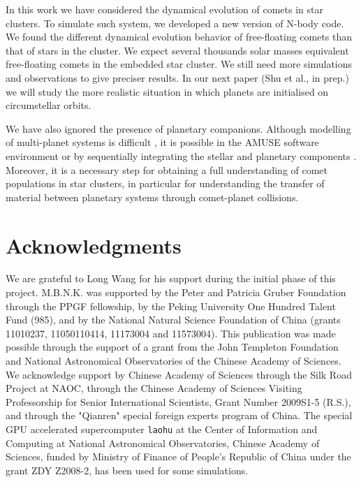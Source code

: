 \documentclass[usenatbib]{mn2e}
\begin{document}


In this work we have considered the dynamical evolution of comets in star clusters. To simulate such system, we developed a new version of N-body code. We found the different dynamical evolution behavior of free-floating comets than that of stars in the cluster. We expect several thousands solar masses equivalent free-floating comets in the embedded star cluster. We still need more simulations and observations to give preciser results.
In our next paper (Shu et al., in prep.) we will study the more realistic situation in which planets are initialised on circumstellar orbits. 

We have also ignored the presence of planetary companions. Although modelling of multi-planet systems is difficult \citep[][]{Hao:2013aa, Shara:2016aa}, it is possible in the AMUSE software environment \citep[see][]{Portegies-Zwart:2013aa, Pelupessy:2013aa, Cai:2016aa} or by sequentially integrating the stellar and planetary components \citep[][]{Cai:2015aa}. Moreover, it is a necessary step for obtaining a full understanding of comet populations in star clusters, in particular for understanding the transfer of material between planetary systems through comet-planet collisions. 


\section*{Acknowledgments}
We are grateful to Long Wang for his support during the initial phase of this project.
M.B.N.K. was supported by the Peter and Patricia Gruber Foundation through the PPGF fellowship, by the Peking University One Hundred Talent Fund (985), and by the National Natural Science Foundation of China (grants 11010237, 11050110414, 11173004 and 11573004). 
This publication was made possible through the support of a grant from 
the John Templeton Foundation and National Astronomical Observatories of the
Chinese Academy of Sciences. 
We acknowledge support by Chinese Academy of Sciences through the Silk Road
Project at NAOC, through the Chinese Academy of Sciences Visiting Professorship for Senior International Scientists, Grant Number 2009S1-5 (R.S.), and through the "Qianren" special foreign experts program of China.
The special GPU accelerated supercomputer {\tt laohu} at the Center of Information and
Computing at National Astronomical Observatories, Chinese Academy of Sciences, funded by Ministry of Finance of People's Republic of China under the grant ZDY Z2008-2, has been used for some simulations. 
\end{document}
